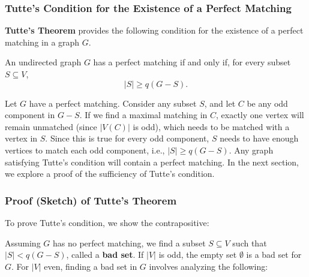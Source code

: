 \subsubsection*{Tutte's Condition for the Existence of a Perfect Matching}

\textbf{Tutte’s Theorem} provides the following condition for the existence of a perfect matching in a graph \( G \).

\begin{theorem}
    An undirected graph \( G \) has a perfect matching if and only if, for every subset \( S \subseteq V \),
    \[
    |S| \geq q(G - S).
    \]
\end{theorem}

Let \( G \) have a perfect matching. Consider any subset \( S \), and let \( C \) be any odd component in \( G - S \). If we find a maximal matching in \( C \), exactly one vertex will remain unmatched (since \( |V(C)| \) is odd), which needs to be matched with a vertex in \( S \). Since this is true for every odd component, \( S \) needs to have enough vertices to match each odd component, i.e., \( |S| \geq q(G - S) \).
Any graph satisfying Tutte’s condition will contain a perfect matching. In the next section, we explore a proof of the sufficiency of Tutte’s condition.

\subsubsection*{Proof (Sketch) of Tutte’s Theorem}

To prove Tutte's condition, we show the contrapositive: 

Assuming \( G \) has no perfect matching, we find a subset \( S \subseteq V \) such that \( |S| < q(G - S) \), called a \textbf{bad set}. If \( |V| \) is odd, the empty set \( \emptyset \) is a bad set for \( G \). For \( |V| \) even, finding a bad set in \( G \) involves analyzing the following:


